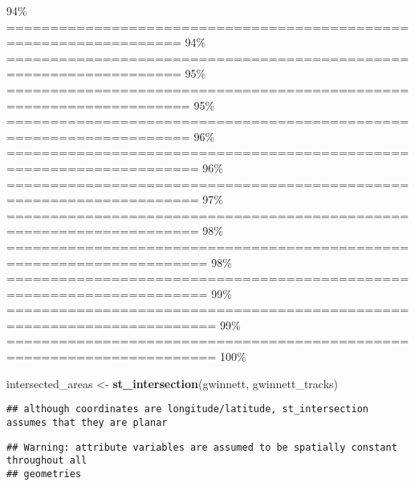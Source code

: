 \documentclass[
]{article}
\newenvironment{Shaded}{\begin{snugshade}}{\end{snugshade}}
\newcommand{\CommentTok}[1]{\textcolor[rgb]{0.56,0.35,0.01}{\textit{#1}}}
\newcommand{\DataTypeTok}[1]{\textcolor[rgb]{0.13,0.29,0.53}{#1}}
\newcommand{\KeywordTok}[1]{\textcolor[rgb]{0.13,0.29,0.53}{\textbf{#1}}}
\newcommand{\NormalTok}[1]{#1}
\newcommand{\OperatorTok}[1]{\textcolor[rgb]{0.81,0.36,0.00}{\textbf{#1}}}
\newcommand{\StringTok}[1]{\textcolor[rgb]{0.31,0.60,0.02}{#1}}
\begin{document}
\textbar{} 94\% \textbar{}
\textbar==================================================================
\textbar{} 94\% \textbar{}
\textbar==================================================================
\textbar{} 95\% \textbar{}
\textbar===================================================================
\textbar{} 95\% \textbar{}
\textbar===================================================================
\textbar{} 96\% \textbar{}
\textbar====================================================================
\textbar{} 96\% \textbar{}
\textbar====================================================================
\textbar{} 97\% \textbar{}
\textbar====================================================================
\textbar{} 98\% \textbar{}
\textbar=====================================================================
\textbar{} 98\% \textbar{}
\textbar=====================================================================
\textbar{} 99\% \textbar{}
\textbar======================================================================\textbar{}
99\% \textbar{}
\textbar======================================================================\textbar{}
100\%

\begin{Shaded}
\begin{Highlighting}[]
\NormalTok{intersected_areas <-}\StringTok{ }\KeywordTok{st_intersection}\NormalTok{(gwinnett, gwinnett_tracks)}
\end{Highlighting}
\end{Shaded}

\begin{verbatim}
## although coordinates are longitude/latitude, st_intersection assumes that they are planar
\end{verbatim}

\begin{verbatim}
## Warning: attribute variables are assumed to be spatially constant throughout all
## geometries
\end{verbatim}

\begin{Shaded}
\end{Shaded}
\end{document}
